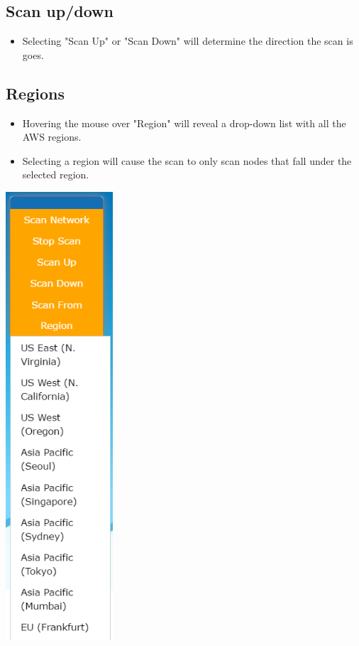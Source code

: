 \documentclass[hidelinks,a4paper,12pt]{article}
\begin{document}
	
	\subsection{Scan up/down}
			\begin {itemize}
			\item Selecting "Scan Up" or "Scan Down" will determine the direction the scan is goes.
	\end{itemize}
		
		\newpage
		
			\subsection{Regions}
			\begin {itemize}
			\item Hovering the mouse over "Region" will reveal a drop-down list with all the AWS regions. 
			\item Selecting a region will cause the scan to only scan nodes that fall under the selected region.
		\end{itemize}
		
		\begin{center}
			\includegraphics[width=0.3\textwidth]{./images/RegionSelect.png}

		\end{center}	
		
\end{document}
